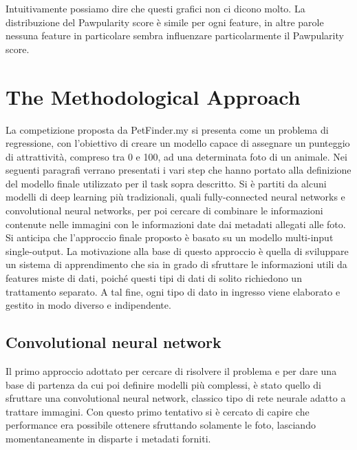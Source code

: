     Intuitivamente possiamo dire che questi grafici non ci dicono molto. La distribuzione del Pawpularity score è simile per ogni feature, in altre parole nessuna feature in particolare sembra influenzare particolarmente il Pawpularity score.
    \vfill

\section{The Methodological Approach}

    La competizione proposta da PetFinder.my si presenta come un problema di regressione, con l'obiettivo di creare un modello capace di assegnare un punteggio di attrattività, 
    compreso tra 0 e 100, ad una determinata foto di un animale.
    Nei seguenti paragrafi verrano presentati i vari step che hanno portato alla definizione del modello finale utilizzato per il task sopra descritto.
    Si è partiti da alcuni modelli di deep learning più tradizionali, quali fully-connected neural networks e convolutional neural networks, per poi cercare di combinare le informazioni
    contenute nelle immagini con le informazioni date dai metadati allegati alle foto.
    Si anticipa che l'approccio finale proposto è basato su un modello multi-input single-output. La motivazione alla base di questo approccio è quella di sviluppare un sistema di 
    apprendimento che sia in grado di sfruttare le informazioni utili da features miste di dati, poiché questi tipi di dati di solito richiedono un trattamento separato. 
    A tal fine, ogni tipo di dato in ingresso viene elaborato e gestito in modo diverso e indipendente.

    \subsection{Convolutional neural network}
    \label{cnn}
        Il primo approccio adottato per cercare di risolvere il problema e per dare una base di partenza da cui poi definire modelli più complessi, è stato quello di sfruttare
        una convolutional neural network, classico tipo di rete neurale adatto a trattare immagini. Con questo primo tentativo si è cercato di capire che performance era possibile
        ottenere sfruttando solamente le foto, lasciando momentaneamente in disparte i metadati forniti.

